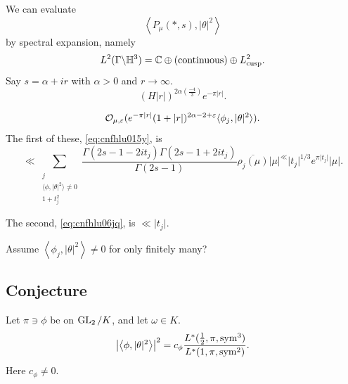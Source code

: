 \documentclass[reqno]{amsart} 
\begin{document}
We can evaluate
\begin{equation*}
  \left\langle P_\mu(\ast, s) , \lvert \theta  \rvert^2 \right\rangle
\end{equation*}
by spectral expansion, namely
\begin{equation*}
  L^2(\Gamma \backslash \mathbb{H}^3)
  = \mathbb{C} \oplus(\text{continuous}) \oplus L^2_{\operatorname{cusp}}.  
\end{equation*}
Say $s = \alpha + i r$ with $\alpha > 0$ and $r \rightarrow \infty$.
\begin{equation}\label{eq:cnfhlu015y}
  (H \lvert r \rvert)^{2 \alpha \left( \frac{- 4 }{3} \right)}
  e^{- \pi \lvert r \rvert}.
\end{equation}

\begin{equation}\label{eq:cnfhlu06jq}
  \mathcal{O}_{\mu, \varepsilon }(e^{- \pi \lvert r \rvert}(1 + \lvert r \rvert)^{2 \alpha - 2 + \varepsilon} \langle \phi_j, \lvert \theta  \rvert^2  \rangle).
\end{equation}
The first of these, \eqref{eq:cnfhlu015y}, is
\begin{equation*}
  \ll \sum_{
    \substack{
      j  \\
      \langle \phi, \lvert \theta  \rvert^2  \rangle \neq 0 \\
      1 + t_j^2
    }
  }
  \frac{\Gamma(2 s - 1 - 2 i t_j ) \Gamma(2 s - 1 + 2 i t_j )}{ \Gamma(2 s - 1)}
  \overline{\rho_j(\mu )} \lvert \mu \rvert^
  \ll \lvert t_j  \rvert^{1/3} e^{\pi \lvert t_j  \rvert} \lvert \mu  \rvert.
\end{equation*}

The second, \eqref{eq:cnfhlu06jq}, is $\ll \lvert t_j \rvert$.

Assume $\left\langle \phi_j, \lvert \theta  \rvert^2 \right\rangle \neq 0$ for only finitely many?


\subsection{Conjecture}\label{sec:cnfhlu7t9k}
Let $\pi \ni \phi$ be on $\operatorname{GL}_2 / K$, and let $\omega \in K$.
\begin{equation*}
  \left\lvert \left\langle \phi, \lvert \theta  \rvert^2 \right\rangle \right\rvert^2
  = c_\phi
  \frac{L^\ast(\tfrac{1}{2}, \pi, \operatorname{sym}^3)}{L^\ast(1, \pi, \operatorname{sym}^2)}.
\end{equation*}
Here $c_\phi \neq 0$.{} 
\end{document}
